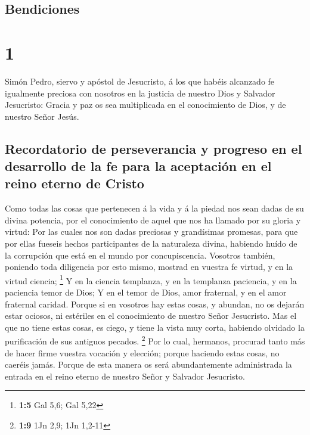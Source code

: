 \hypertarget{bendiciones}{%
\subsection{Bendiciones}\label{bendiciones}}

\hypertarget{section}{%
\section{1}\label{section}}

 Simón Pedro, siervo y apóstol de Jesucristo, á los que
habéis alcanzado fe igualmente preciosa con nosotros en la justicia de
nuestro Dios y Salvador Jesucristo:  Gracia y paz os sea
multiplicada en el conocimiento de Dios, y de nuestro Señor Jesús.

\hypertarget{recordatorio-de-perseverancia-y-progreso-en-el-desarrollo-de-la-fe-para-la-aceptaciuxf3n-en-el-reino-eterno-de-cristo}{%
\subsection{Recordatorio de perseverancia y progreso en el desarrollo de
la fe para la aceptación en el reino eterno de
Cristo}\label{recordatorio-de-perseverancia-y-progreso-en-el-desarrollo-de-la-fe-para-la-aceptaciuxf3n-en-el-reino-eterno-de-cristo}}

 Como todas las cosas que pertenecen á la vida y á la
piedad nos sean dadas de su divina potencia, por el conocimiento de
aquel que nos ha llamado por su gloria y virtud:  Por las
cuales nos son dadas preciosas y grandísimas promesas, para que por
ellas fueseis hechos participantes de la naturaleza divina, habiendo
huído de la corrupción que está en el mundo por concupiscencia.
 Vosotros también, poniendo toda diligencia por esto
mismo, mostrad en vuestra fe virtud, y en la virtud ciencia; \footnote{\textbf{1:5}
  Gal 5,6; Gal 5,22}  Y en la ciencia templanza, y en la
templanza paciencia, y en la paciencia temor de Dios;  Y
en el temor de Dios, amor fraternal, y en el amor fraternal caridad.
 Porque si en vosotros hay estas cosas, y abundan, no os
dejarán estar ociosos, ni estériles en el conocimiento de nuestro Señor
Jesucristo.  Mas el que no tiene estas cosas, es ciego, y
tiene la vista muy corta, habiendo olvidado la purificación de sus
antiguos pecados. \footnote{\textbf{1:9} 1Jn 2,9; 1Jn 1,2-11}
 Por lo cual, hermanos, procurad tanto más de hacer firme
vuestra vocación y elección; porque haciendo estas cosas, no caeréis
jamás.  Porque de esta manera os será abundantemente
administrada la entrada en el reino eterno de nuestro Señor y Salvador
Jesucristo.


